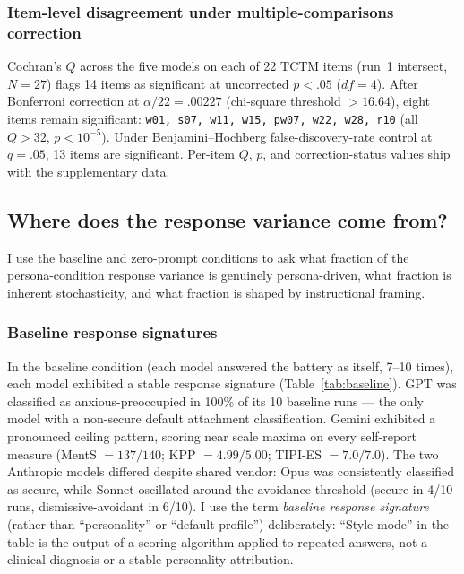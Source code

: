 \documentclass[11pt,a4paper]{article}
\begin{document}
\subsubsection*{Item-level disagreement under multiple-comparisons correction}

Cochran's $Q$ across the five models on each of 22 TCTM items (run~1 intersect, $N = 27$) flags 14 items as significant at uncorrected $p < .05$ ($df = 4$). After Bonferroni correction at $\alpha / 22 = .00227$ (chi-square threshold $> 16.64$), eight items remain significant: \texttt{w01, s07, w11, w15, pw07, w22, w28, r10} (all $Q > 32$, $p < 10^{-5}$). Under Benjamini--Hochberg false-discovery-rate control at $q = .05$, 13 items are significant. Per-item $Q$, $p$, and correction-status values ship with the supplementary data.

\subsection{Where does the response variance come from?}\label{sec:variance}

I use the baseline and zero-prompt conditions to ask what fraction of the persona-condition response variance is genuinely persona-driven, what fraction is inherent stochasticity, and what fraction is shaped by instructional framing.

\subsubsection*{Baseline response signatures}

In the baseline condition (each model answered the battery as itself, 7--10 times), each model exhibited a stable response signature (Table~\ref{tab:baseline}). GPT was classified as anxious-preoccupied in 100\% of its 10 baseline runs --- the only model with a non-secure default attachment classification. Gemini exhibited a pronounced ceiling pattern, scoring near scale maxima on every self-report measure (MentS $= 137 / 140$; KPP $= 4.99 / 5.00$; TIPI-ES $= 7.0 / 7.0$). The two Anthropic models differed despite shared vendor: Opus was consistently classified as secure, while Sonnet oscillated around the avoidance threshold (secure in 4/10 runs, dismissive-avoidant in 6/10). I use the term \emph{baseline response signature} (rather than ``personality'' or ``default profile'') deliberately: ``Style mode'' in the table is the output of a scoring algorithm applied to repeated answers, not a clinical diagnosis or a stable personality attribution.
\end{document}
